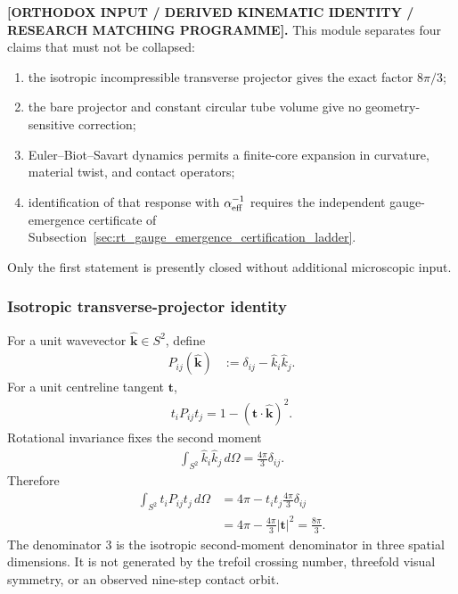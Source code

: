 \textbf{[ORTHODOX INPUT / DERIVED KINEMATIC IDENTITY / RESEARCH MATCHING
PROGRAMME].}
This module separates four claims that must not be collapsed:
\begin{enumerate}
    \item the isotropic incompressible transverse projector gives the exact
    factor \(8\pi/3\);
    \item the bare projector and constant circular tube volume give no
    geometry-sensitive correction;
    \item Euler--Biot--Savart dynamics permits a finite-core expansion in
    curvature, material twist, and contact operators;
    \item identification of that response with
    \(\alpha_{\rm eff}^{-1}\) requires the independent gauge-emergence
    certificate of
    Subsection~\ref{sec:rt_gauge_emergence_certification_ladder}.
\end{enumerate}
Only the first statement is presently closed without additional microscopic
input.

\subsubsection{Isotropic transverse-projector identity}

For a unit wavevector \(\widehat{\mathbf k}\in S^2\), define
\begin{align}
    P_{ij}(\widehat{\mathbf k})
    &:=
    \delta_{ij}-\widehat k_i\widehat k_j.
    \label{eq:rt_alpha_transverse_projector_v0835}
\end{align}
For a unit centreline tangent \(\mathbf t\),
\begin{align}
    t_iP_{ij}t_j
    =
    1-(\mathbf t\cdot\widehat{\mathbf k})^2.
\end{align}
Rotational invariance fixes the second moment
\begin{align}
    \int_{S^2}
    \widehat k_i\widehat k_j\,d\Omega
    =
    \frac{4\pi}{3}\delta_{ij}.
    \label{eq:rt_alpha_isotropic_second_moment_v0835}
\end{align}
Therefore
\begin{align}
    \int_{S^2}t_iP_{ij}t_j\,d\Omega
    &=
    4\pi
    -
    t_it_j\frac{4\pi}{3}\delta_{ij}
    \nonumber\\
    &=
    4\pi-\frac{4\pi}{3}|\mathbf t|^2
    =
    \boxed{\frac{8\pi}{3}}.
    \label{eq:rt_alpha_projector_identity_v0835}
\end{align}
The denominator \(3\) is the isotropic second-moment denominator in three
spatial dimensions.  It is not generated by the trefoil crossing number,
threefold visual symmetry, or an observed nine-step contact orbit.

